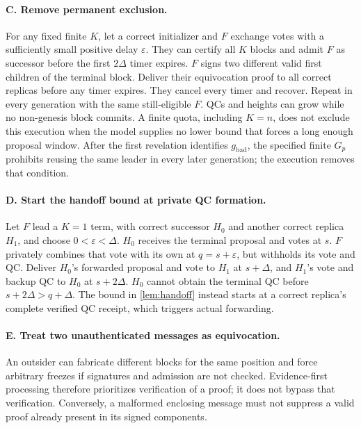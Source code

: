 \documentclass[11pt,a4paper]{article}
\begin{document}
\paragraph{C. Remove permanent exclusion.}
For any fixed finite $K$, let a correct initializer and $F$ exchange votes
with a sufficiently small positive delay $\varepsilon$. They can certify
all $K$ blocks and admit $F$ as successor before the first $2\Delta$
timer expires. $F$ signs two different valid first children of the terminal
block. Deliver their equivocation proof to all correct replicas before
any timer expires. They cancel every timer and recover. Repeat in every
generation with the same still-eligible $F$. QCs and heights can grow
while no non-genesis block commits. A finite quota, including $K=n$,
does not exclude this execution when the model supplies no lower bound
that forces a long enough proposal window. After the first revelation
identifies $g_{\mathrm{bad}}$, the specified finite $G_p$ prohibits reusing
the same leader in every later generation; the execution removes that condition.

\paragraph{D. Start the handoff bound at private QC formation.}
Let $F$ lead a $K=1$ term, with correct successor $H_0$ and another correct
replica $H_1$, and choose $0<\varepsilon<\Delta$.
$H_0$ receives the terminal proposal and votes at $s$.
$F$ privately combines that vote with its own at $q=s+\varepsilon$,
but withholds its vote and QC. Deliver $H_0$'s forwarded proposal and vote
to $H_1$ at $s+\Delta$, and $H_1$'s vote and backup QC to $H_0$ at
$s+2\Delta$.
$H_0$ cannot obtain the terminal QC before $s+2\Delta>q+\Delta$.
The bound in \cref{lem:handoff} instead starts at a correct replica's
complete verified QC receipt, which triggers actual forwarding.

\paragraph{E. Treat two unauthenticated messages as equivocation.}
An outsider can fabricate different blocks for the same position and
force arbitrary freezes if signatures and admission are not checked.
Evidence-first processing therefore prioritizes verification of a proof;
it does not bypass that verification. Conversely, a malformed enclosing
message must not suppress a valid proof already present in its signed
components.
\end{document}
